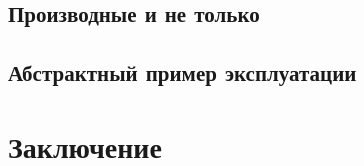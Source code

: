 \documentclass[final, xcolor = table, usenames, dvipsnames, table, aspectratio = 169]{beamer}
\begin{document}
% 

\subsection{Производные и не только}


\subsection{Абстрактный пример эксплуатации}



\section{Заключение}



\end{document}
